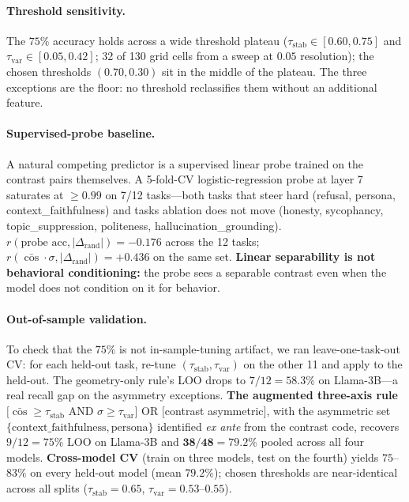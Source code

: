 \documentclass{article}
\begin{document}
\paragraph{Threshold sensitivity.}
The $75\%$ accuracy holds across a wide threshold plateau
($\tau_{\text{stab}} \in [0.60, 0.75]$ and
$\tau_{\text{var}} \in [0.05, 0.42]$; 32 of 130 grid cells from a
sweep at $0.05$ resolution); the chosen thresholds $(0.70, 0.30)$
sit in the middle of the plateau. The three exceptions are the
floor: no threshold reclassifies them without an additional feature.

\paragraph{Supervised-probe baseline.}
A natural competing predictor is a supervised linear probe trained
on the contrast pairs themselves. A 5-fold-CV logistic-regression
probe at layer 7 saturates at $\geq 0.99$ on 7/12 tasks---both
tasks that steer hard (refusal, persona, context\_faithfulness)
and tasks ablation does not move (honesty, sycophancy,
topic\_suppression, politeness, hallucination\_grounding).
$r(\text{probe acc}, |\Delta_{\text{rand}}|) = -0.176$ across the
12 tasks; $r(\bar{\cos} \cdot \sigma, |\Delta_{\text{rand}}|) =
+0.436$ on the same set. \textbf{Linear separability is not
behavioral conditioning:} the probe sees a separable contrast even
when the model does not condition on it for behavior.

\paragraph{Out-of-sample validation.}
To check that the $75\%$ is not in-sample-tuning artifact, we ran
leave-one-task-out CV: for each held-out task, re-tune
$(\tau_{\text{stab}}, \tau_{\text{var}})$ on the other 11 and apply
to the held-out. The geometry-only rule's LOO drops to $7/12 \!=\!
58.3\%$ on Llama-3B---a real recall gap on the asymmetry
exceptions. \textbf{The augmented three-axis rule}
$\big[\bar{\cos} \!\geq\! \tau_{\text{stab}}$ AND
$\sigma \!\geq\! \tau_{\text{var}}\big]$ OR $\big[$contrast
asymmetric$\big]$, with the asymmetric set
$\{\text{context\_faithfulness}, \text{persona}\}$ identified
\emph{ex ante} from the contrast code, recovers $9/12 = 75\%$ LOO
on Llama-3B and $\mathbf{38/48 = 79.2\%}$ pooled across all four
models. \textbf{Cross-model CV} (train on three models, test on the
fourth) yields $75$--$83\%$ on every held-out model (mean $79.2\%$);
chosen thresholds are near-identical across all splits
($\tau_{\text{stab}} \!=\! 0.65$, $\tau_{\text{var}} \!=\!
0.53$--$0.55$).
\end{document}
